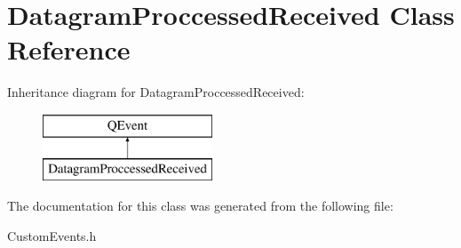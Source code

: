 \hypertarget{class_datagram_proccessed_received}{}\section{Datagram\+Proccessed\+Received Class Reference}
\label{class_datagram_proccessed_received}
Inheritance diagram for Datagram\+Proccessed\+Received\+:\begin{figure}[H]
\begin{center}
\leavevmode
\includegraphics[height=2.000000cm]{class_datagram_proccessed_received}
\end{center}
\end{figure}


The documentation for this class was generated from the following file\+:\begin{DoxyCompactItemize}
\item 
Custom\+Events.\+h\end{DoxyCompactItemize}

